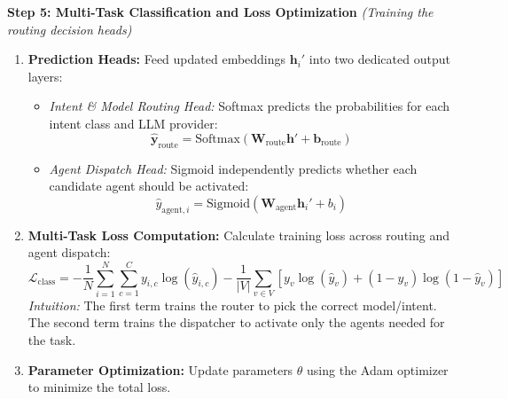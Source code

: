 \documentclass[11pt,a4paper]{article}
\begin{document}
\textbf{Step 5: Multi-Task Classification and Loss Optimization} \emph{(Training the routing decision heads)}
\begin{enumerate}[leftmargin=1.5em, itemsep=0.25em, topsep=0.08em]
    \item \textbf{Prediction Heads:} Feed updated embeddings $\mathbf{h}_i'$ into two dedicated output layers:
    \begin{itemize}[leftmargin=1.2em, itemsep=0.15em, topsep=0.05em]
        \item \emph{Intent \& Model Routing Head:} Softmax predicts the probabilities for each intent class and LLM provider:
        \[
        \hat{\mathbf{y}}_{\text{route}} = \mathrm{Softmax}(\mathbf{W}_{\text{route}} \mathbf{h}' + \mathbf{b}_{\text{route}})
        \]
        \item \emph{Agent Dispatch Head:} Sigmoid independently predicts whether each candidate agent should be activated:
        \[
        \hat{y}_{\text{agent}, i} = \mathrm{Sigmoid}(\mathbf{W}_{\text{agent}} \mathbf{h}_i' + b_i)
        \]
    \end{itemize}
    \item \textbf{Multi-Task Loss Computation:} Calculate training loss across routing and agent dispatch:
    \[
    \mathcal{L}_{\text{class}} = -\frac{1}{N} \sum_{i=1}^N \sum_{c=1}^C y_{i,c} \log(\hat{y}_{i,c}) - \frac{1}{|V|} \sum_{v \in V} \left[ y_v \log(\hat{y}_v) + (1 - y_v) \log(1 - \hat{y}_v) \right]
    \]
    \emph{Intuition:} The first term trains the router to pick the correct model/intent. The second term trains the dispatcher to activate only the agents needed for the task.
    \item \textbf{Parameter Optimization:} Update parameters $\theta$ using the Adam optimizer to minimize the total loss.
\end{enumerate}
\end{document}
